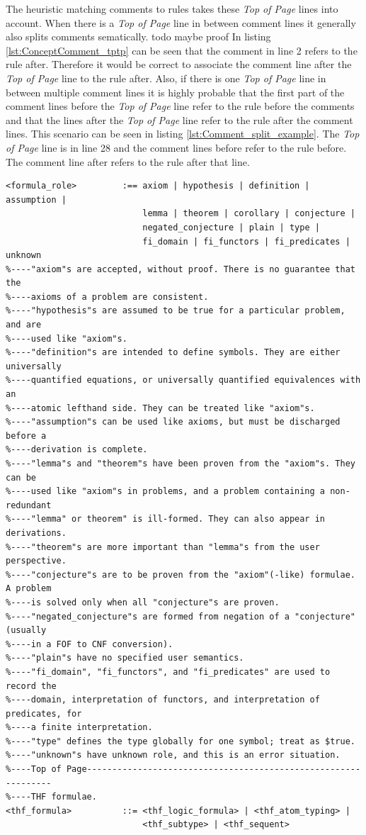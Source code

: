 The heuristic matching comments to rules takes these \textit{Top of Page} lines into account.
When there is a \textit{Top of Page} line in between comment lines it generally also splits comments sematically. todo maybe proof
In listing \ref{lst:ConceptComment_tptp} can be seen that the comment in line 2 refers to the rule after.
Therefore it would be correct to associate the comment line after the \textit{Top of Page} line to the rule after.
Also, if there is one \textit{Top of Page} line in between multiple comment lines it is highly probable that the first part of the comment lines before the \textit{Top of Page} line refer to the rule before the comments and that the lines after the \textit{Top of Page} line refer to the rule after the comment lines.
This scenario can be seen in listing \ref{lst:Comment_split_example}.
The \textit{Top of Page} line is in line 28 and the comment lines before refer to the rule before.
The comment line after refers to the rule after that line.
\begin{lstlisting}[language=none, basicstyle=\scriptsize	,caption=Comment lines split by a \textit{Top of Page} line in the \ac{TPTP} syntax,label= lst:Comment_split_example]
<formula_role>         :== axiom | hypothesis | definition | assumption |
                           lemma | theorem | corollary | conjecture |
                           negated_conjecture | plain | type |
                           fi_domain | fi_functors | fi_predicates | unknown
%----"axiom"s are accepted, without proof. There is no guarantee that the
%----axioms of a problem are consistent.
%----"hypothesis"s are assumed to be true for a particular problem, and are
%----used like "axiom"s.
%----"definition"s are intended to define symbols. They are either universally
%----quantified equations, or universally quantified equivalences with an
%----atomic lefthand side. They can be treated like "axiom"s.
%----"assumption"s can be used like axioms, but must be discharged before a
%----derivation is complete.
%----"lemma"s and "theorem"s have been proven from the "axiom"s. They can be
%----used like "axiom"s in problems, and a problem containing a non-redundant
%----"lemma" or theorem" is ill-formed. They can also appear in derivations.
%----"theorem"s are more important than "lemma"s from the user perspective.
%----"conjecture"s are to be proven from the "axiom"(-like) formulae. A problem
%----is solved only when all "conjecture"s are proven.
%----"negated_conjecture"s are formed from negation of a "conjecture" (usually
%----in a FOF to CNF conversion).
%----"plain"s have no specified user semantics.
%----"fi_domain", "fi_functors", and "fi_predicates" are used to record the
%----domain, interpretation of functors, and interpretation of predicates, for
%----a finite interpretation.
%----"type" defines the type globally for one symbol; treat as $true.
%----"unknown"s have unknown role, and this is an error situation.
%----Top of Page---------------------------------------------------------------
%----THF formulae.
<thf_formula>          ::= <thf_logic_formula> | <thf_atom_typing> |
                           <thf_subtype> | <thf_sequent>
\end{lstlisting}

